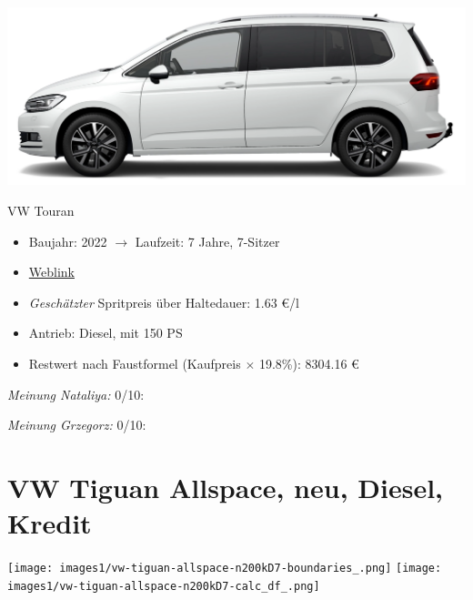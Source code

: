 \documentclass[landscape, DIV=99, 14pt]{scrartcl}
\begin{document}
\pagebreak
\begin{center}
\includegraphics[width=0.9\columnwidth]{cars/vw-touran-neu-benzin.png}

VW Touran
\end{center}

\begin{itemize}
    \item Baujahr: 2022 $\rightarrow$ Laufzeit: 7 Jahre, 7-Sitzer
    \item \href{https://www.volkswagen.de/de/konfigurator.html/__app/touran/touran/highline.app?buildabilityStatus-app=buildable&category-app=private&carlineId-app=31000&salesGroupId-app=32600&trimName-app=Highline&modelId-app=5T146Z%24GYORYOR&modelVersion-app=1&modelYear-app=2022&exteriorId-app=F14+0Q0Q&interiorId-app=F56+++++BG&options-app=GWBGWBG-GPG3PG3-MAHV1M6-GPF9PF9-GRBDRBD-MKSUKA1-MSSH4KF-GP19P19-MVTV9IJ-GWQ1WQ1}{Weblink}
    \item \emph{Gesch\"atzter} Spritpreis \"uber Haltedauer: 1.63 \euro{}/l
    \item Antrieb: Diesel, mit 150 PS
    \item Restwert nach Faustformel (Kaufpreis $\times$ 19.8\%): 8304.16 \euro{}
\end{itemize}

\begin{small}
\emph{Meinung Nataliya:} 0/10: 
        
\emph{Meinung Grzegorz:} 0/10: 
\end{small}

\pagebreak


\twocolumn

\section*{VW Tiguan Allspace, neu, Diesel, Kredit}
\begin{center}
\texttt{[image: images1/vw-tiguan-allspace-n200kD7-boundaries\_.png]}
\null
\vspace{0.5cm}
\texttt{[image: images1/vw-tiguan-allspace-n200kD7-calc\_df\_.png]}
\end{center}
\end{document}
